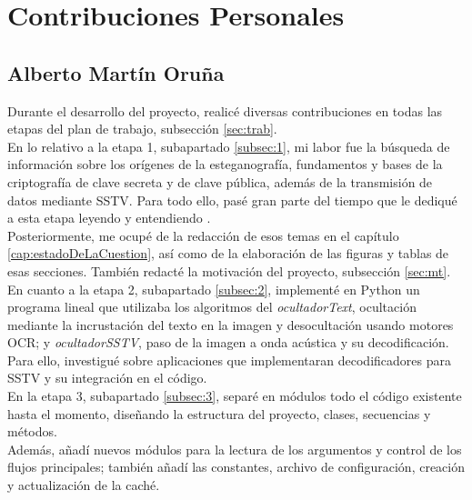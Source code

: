 \chapter*{Contribuciones Personales}
\label{cap:contribucionesPersonales}

\section*{Alberto Martín Oruña}

Durante el desarrollo del proyecto, realicé diversas contribuciones en todas las etapas del plan de trabajo, subsección \ref{sec:trab}.\\

En lo relativo a la etapa 1, subapartado \ref{subsec:1}, mi labor fue la búsqueda de información sobre los orígenes de la esteganografía, fundamentos y bases de la criptografía de clave secreta y de clave pública, además de la transmisión de datos mediante SSTV. Para todo ello, pasé gran parte del tiempo que le dediqué a esta etapa leyendo y entendiendo \cite{carracedo2004}.\\


Posteriormente, me ocupé de la redacción de esos temas en el capítulo \ref{cap:estadoDeLaCuestion}, así como de la elaboración de las figuras y tablas de esas secciones. También redacté la motivación del proyecto, subsección \ref{sec:mt}.\\

En cuanto a la etapa 2, subapartado \ref{subsec:2}, implementé en Python un programa lineal que utilizaba los algoritmos del \textit{ocultadorText}, ocultación mediante la incrustación del texto en la imagen y desocultación usando motores OCR; y \textit{ocultadorSSTV}, paso de la imagen a onda acústica y su decodificación. Para ello, investigué sobre aplicaciones que implementaran decodificadores para SSTV y su integración en el código.\\

En la etapa 3, subapartado \ref{subsec:3}, separé en módulos todo el código existente hasta el momento, diseñando la estructura del proyecto, clases, secuencias y métodos.\\

Además, añadí nuevos módulos para la lectura de los argumentos y control de los flujos principales; también añadí las constantes, archivo de configuración, creación y actualización de la caché.\\

